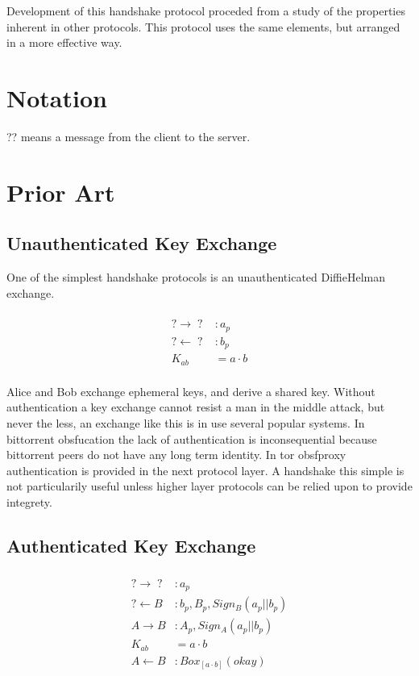 \documentclass[12pt]{article}
\begin{document}
Development of this handshake protocol proceded from a study of the
properties inherent in other protocols. This protocol uses the same
elements, but arranged in a more effective way.

\section{Notation}

?\to ? means a message from  the client to the server.

\section{Prior Art}

\subsection{Unauthenticated Key Exchange}

One of the simplest handshake protocols is an unauthenticated
DiffieHelman exchange.

$$
\begin{align*}
\\
    ? \to \;?\; &: a_p \\
    ? \gets \;?\; &: b_p \\
      K_{ab} &= a\cdot b
\\
\end{align*}
$$

Alice and Bob exchange ephemeral keys, and derive a shared key.
Without authentication a key exchange cannot resist
a man in the middle attack, but never the less,
an exchange like this is in use several popular systems.
In bittorrent obsfucation the lack of authentication is
inconsequential because bittorrent peers do not have any
long term identity.
In tor obsfproxy authentication is provided in the next protocol layer.
A handshake this simple is not particularily useful unless
higher layer protocols can be relied upon to provide integrety.

\subsection{Authenticated Key Exchange}

$$
\begin{align*}
\\
    ? \to \;?\;   &: a_p \\
    ? \gets B &: b_p, B_p, Sign_B(a_p||b_p) \\
    A \to B   &: A_p, Sign_A(a_p||b_p) \\
          K_{ab} &= a \cdot b \\
    A \gets B &: Box_{[a\cdot b]}(okay) \\
\\
\end{align*}
$$
\end{document}
